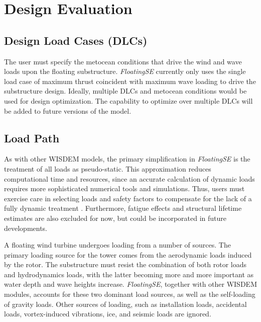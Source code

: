 \chapter{Design Evaluation}
\label{sec:theory}

\section{Design Load Cases (DLCs)}
The user must specify the metocean conditions that drive the wind and
wave loads upon the floating substructure.  \textit{FloatingSE}
currently only uses the single load case of maximum thrust coincident
with maximum wave loading to drive the substructure design. Ideally,
multiple DLCs and metocean conditions would be used for design
optimization.  The capability to optimize over multiple DLCs will be
added to future versions of the model.

\section{Load Path}
As with other WISDEM models, the primary simplification in
\textit{FloatingSE} is the treatment of all loads as pseudo-static. This
approximation reduces computational time and resources, since an
accurate calculation of dynamic loads requires more sophisticated
numerical tools and simulations.  Thus, users must exercise care in
selecting loads and safety factors to compensate for the lack of a fully
dynamic treatment \citep{damiani2016}.  Furthermore, fatigue effects and
structural lifetime estimates are also excluded for now, but could be
incorporated in future developments.

A floating wind turbine undergoes loading from a number of sources.  The
primary loading source for the tower comes from the aerodynamic loads
induced by the rotor. The substructure must resist the combination of
both rotor loads and hydrodynamics loads, with the latter becoming more
and more important as water depth and wave heights increase.
\textit{FloatingSE}, together with other WISDEM modules, accounts for
these two dominant load sources, as well as the self-loading of gravity
loads.  Other sources of loading, such as installation loads, accidental
loads, vortex-induced vibrations, ice, and seismic loads are ignored.

